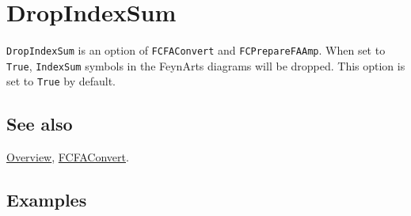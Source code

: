 \documentclass[../FeynCalcManual.tex]{subfiles}
\begin{document}
\hypertarget{dropindexsum}{
\section{DropIndexSum}\label{dropindexsum}}

\texttt{DropIndexSum} is an option of \texttt{FCFAConvert} and
\texttt{FCPrepareFAAmp}. When set to \texttt{True}, \texttt{IndexSum}
symbols in the FeynArts diagrams will be dropped. This option is set to
\texttt{True} by default.

\subsection{See also}

\hyperlink{toc}{Overview}, \hyperlink{fcfaconvert}{FCFAConvert}.

\subsection{Examples}
\end{document}
